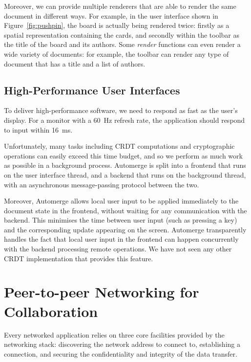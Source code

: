 \documentclass[sigplan,10pt]{acmart}
\begin{document}
Moreover, we can provide multiple renderers that are able to render the same document in different ways.
For example, in the user interface shown in Figure~\ref{fig:pushpin}, the board is actually being rendered twice: firstly as a spatial representation containing the cards, and secondly within the toolbar as the title of the board and its authors. Some \emph{render} functions can even render a wide variety of documents: for example, the toolbar can render any type of document that has a title and a list of authors.

\subsection{High-Performance User Interfaces}

To deliver high-performance software, we need to respond as fast as the user's display. For a monitor with a 60~Hz refresh rate, the application should respond to input within 16~ms.

Unfortunately, many tasks including CRDT computations and cryptographic operations can easily exceed this time budget, and so we perform as much work as possible in a background process.
Automerge is split into a frontend that runs on the user interface thread, and a backend that runs on the background thread, with an asynchronous message-passing protocol between the two.

Moreover, Automerge allows local user input to be applied immediately to the document state in the frontend, without waiting for any communication with the backend.
This minimises the time between user input (such as pressing a key) and the corresponding update appearing on the screen.
Automerge transparently handles the fact that local user input in the frontend can happen concurrently with the backend processing remote operations.
We have not seen any other CRDT implementation that provides this feature.

\section{Peer-to-peer Networking for Collaboration}\label{sec:networking}

Every networked application relies on three core facilities provided by the networking stack: discovering the network address to connect to, establishing a connection, and securing the confidentiality and integrity of the data transfer.
\end{document}
